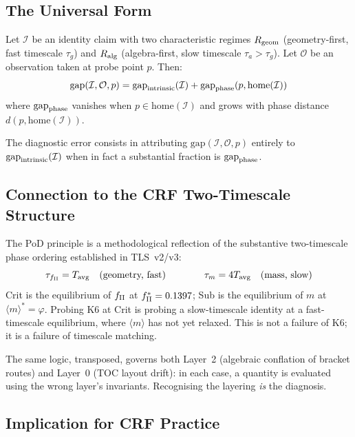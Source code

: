 \documentclass[12pt, a4paper]{article}
\begin{document}
\subsection{The Universal Form}

\begin{formalbox}[title={Phase-Ordered Diagnosis (PoD) Principle}]
Let $\mathcal{I}$ be an identity claim with two characteristic regimes
$R_{\rm geom}$ (geometry-first, fast timescale $\tau_g$) and $R_{\rm alg}$
(algebra-first, slow timescale $\tau_a > \tau_g$). Let $\mathcal{O}$ be an
observation taken at probe point $p$. Then:
\[
  \text{gap}(\mathcal{I},\mathcal{O},p) = \text{gap}_{\rm intrinsic}(\mathcal{I})
  + \text{gap}_{\rm phase}(p, \text{home}(\mathcal{I}))
\]
where $\text{gap}_{\rm phase}$ vanishes when $p \in \text{home}(\mathcal{I})$
and grows with phase distance $d(p, \text{home}(\mathcal{I}))$.

The diagnostic error consists in attributing
$\text{gap}(\mathcal{I},\mathcal{O},p)$ entirely to
$\text{gap}_{\rm intrinsic}(\mathcal{I})$ when in fact a substantial fraction
is $\text{gap}_{\rm phase}$.
\end{formalbox}

\subsection{Connection to the CRF Two-Timescale Structure}

The PoD principle is a methodological reflection of the substantive
two-timescale phase ordering established in TLS~v2/v3:
\[
  \tau_{f_{\rm II}} = T_{\rm avg} \quad (\text{geometry, fast})
  \qquad\qquad
  \tau_m = 4 T_{\rm avg} \quad (\text{mass, slow})
\]
Crit is the equilibrium of $f_{\rm II}$ at $f_{\rm II}^* = 0.1397$; Sub is the
equilibrium of $m$ at $\langle m \rangle^* = \varphi$. Probing K6 at Crit is
probing a slow-timescale identity at a fast-timescale equilibrium, where
$\langle m \rangle$ has not yet relaxed. This is not a failure of K6; it is a
failure of timescale matching.

The same logic, transposed, governs both Layer~2 (algebraic conflation of
bracket routes) and Layer~0 (TOC layout drift): in each case, a quantity is
evaluated using the wrong layer's invariants. Recognising the layering
\emph{is} the diagnosis.

\subsection{Implication for CRF Practice}
\end{document}
